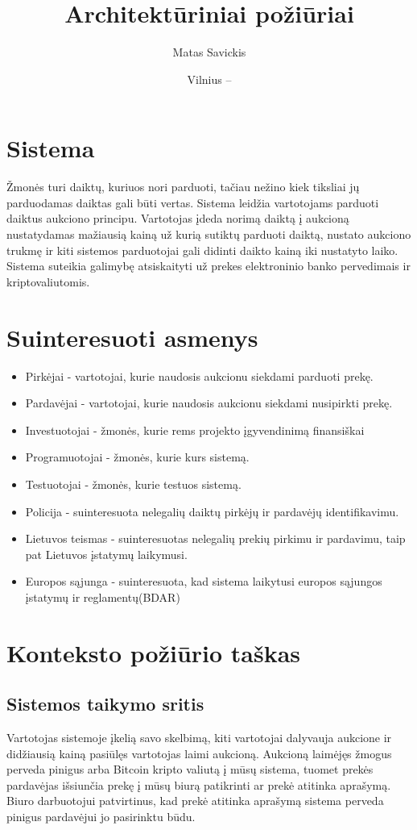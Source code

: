 \documentclass{VUMIFPSmagistrinis}
\title{Architektūriniai požiūriai}
\author{Matas Savickis}
\date{Vilnius – \the\year}
\begin{document}
\maketitle

\tableofcontents
	\section{Sistema}
		Žmonės turi daiktų, kuriuos nori parduoti, tačiau nežino kiek tiksliai jų parduodamas daiktas gali būti vertas.
		Sistema leidžia vartotojams parduoti daiktus aukciono principu.
		Vartotojas įdeda norimą daiktą į aukcioną nustatydamas mažiausią kainą už kurią sutiktų parduoti daiktą, nustato aukciono trukmę ir kiti sistemos parduotojai gali didinti daikto kainą iki nustatyto laiko.
		Sistema suteikia galimybę atsiskaityti už prekes elektroninio banko pervedimais ir kriptovaliutomis.
	\section{Suinteresuoti asmenys}
		\begin{itemize}
			\item{Pirkėjai - vartotojai, kurie naudosis aukcionu siekdami parduoti prekę.}
			\item{Pardavėjai - vartotojai, kurie naudosis aukcionu siekdami nusipirkti prekę.}
			\item{Investuotojai - žmonės, kurie rems projekto įgyvendinimą finansiškai}
			\item{Programuotojai - žmonės, kurie kurs sistemą.}
			\item{Testuotojai - žmonės, kurie testuos sistemą.}
			\item{Policija - suinteresuota nelegalių daiktų pirkėjų ir pardavėjų identifikavimu.}
			\item{Lietuvos teismas - suinteresuotas nelegalių prekių pirkimu ir pardavimu, taip pat Lietuvos įstatymų laikymusi.}
			\item{Europos sąjunga - suinteresuota, kad sistema laikytusi europos sąjungos įstatymų ir reglamentų(BDAR)}
		\end{itemize}
		\section{Konteksto požiūrio taškas}
			\subsection{Sistemos taikymo sritis}
				Vartotojas sistemoje įkelią savo skelbimą, kiti vartotojai dalyvauja aukcione ir didžiausią kainą pasiūlęs vartotojas laimi aukcioną.
				Aukcioną laimėjęs žmogus perveda pinigus arba Bitcoin kripto valiutą į mūsų sistema, tuomet prekės pardavėjas išsiunčia prekę į mūsų biurą patikrinti ar prekė atitinka aprašymą. 
				Biuro darbuotojui patvirtinus, kad prekė atitinka aprašymą sistema perveda pinigus pardavėjui jo pasirinktu būdu.
\end{document}
